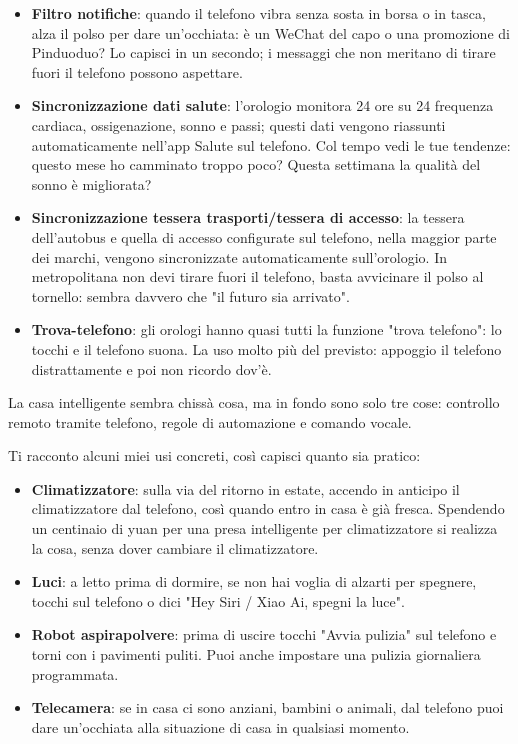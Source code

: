 \begin{itemize}
  \item \textbf{Filtro notifiche}: quando il telefono vibra senza sosta in borsa o in tasca, alza il polso per dare un'occhiata: è un WeChat del capo o una promozione di Pinduoduo? Lo capisci in un secondo; i messaggi che non meritano di tirare fuori il telefono possono aspettare.
  \item \textbf{Sincronizzazione dati salute}: l'orologio monitora 24 ore su 24 frequenza cardiaca, ossigenazione, sonno e passi; questi dati vengono riassunti automaticamente nell'app Salute sul telefono. Col tempo vedi le tue tendenze: questo mese ho camminato troppo poco? Questa settimana la qualità del sonno è migliorata?
  \item \textbf{Sincronizzazione tessera trasporti/tessera di accesso}: la tessera dell'autobus e quella di accesso configurate sul telefono, nella maggior parte dei marchi, vengono sincronizzate automaticamente sull'orologio. In metropolitana non devi tirare fuori il telefono, basta avvicinare il polso al tornello: sembra davvero che "il futuro sia arrivato".
  \item \textbf{Trova-telefono}: gli orologi hanno quasi tutti la funzione "trova telefono": lo tocchi e il telefono suona. La uso molto più del previsto: appoggio il telefono distrattamente e poi non ricordo dov'è.
\end{itemize}


La casa intelligente sembra chissà cosa, ma in fondo sono solo tre cose: controllo remoto tramite telefono, regole di automazione e comando vocale.

Ti racconto alcuni miei usi concreti, così capisci quanto sia pratico:

\begin{itemize}
  \item \textbf{Climatizzatore}: sulla via del ritorno in estate, accendo in anticipo il climatizzatore dal telefono, così quando entro in casa è già fresca. Spendendo un centinaio di yuan per una presa intelligente per climatizzatore si realizza la cosa, senza dover cambiare il climatizzatore.
  \item \textbf{Luci}: a letto prima di dormire, se non hai voglia di alzarti per spegnere, tocchi sul telefono o dici "Hey Siri / Xiao Ai, spegni la luce".
  \item \textbf{Robot aspirapolvere}: prima di uscire tocchi "Avvia pulizia" sul telefono e torni con i pavimenti puliti. Puoi anche impostare una pulizia giornaliera programmata.
  \item \textbf{Telecamera}: se in casa ci sono anziani, bambini o animali, dal telefono puoi dare un'occhiata alla situazione di casa in qualsiasi momento.
\end{itemize}

